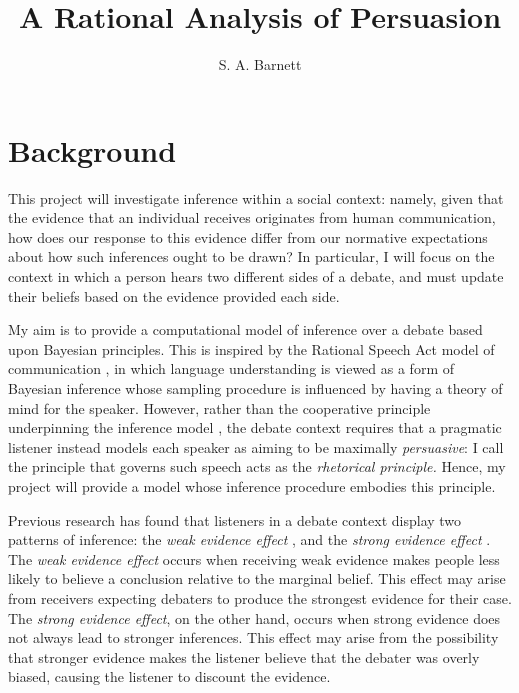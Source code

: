 \documentclass{article}
\title{A Rational Analysis of Persuasion}
\author{S. A. Barnett}
\date{}
\begin{document}
\maketitle

\section{Background}

This project will investigate inference within a social context: namely, given that the evidence that an individual receives originates from human communication, how does our response to this evidence differ from our normative expectations about how such inferences ought to be drawn? In particular, I will focus on the context in which a person hears two different sides of a debate, and must update their beliefs based on the evidence provided each side. 

My aim is to provide a computational model of inference over a debate based upon Bayesian principles. This is inspired by the Rational Speech Act model of communication \cite{goodman_pragmatic_2016}, in which language understanding is viewed as a form of Bayesian inference whose sampling procedure is influenced by having a theory of mind for the speaker. However, rather than the cooperative principle underpinning the inference model \cite{grice_logic_1975}, the debate context requires that a pragmatic listener instead models each speaker as aiming to be maximally \textit{persuasive}: I call the principle that governs such speech acts as the \textit{rhetorical principle.} Hence, my project will provide a model whose inference procedure embodies this principle.

Previous research has found that listeners in a debate context display two patterns of inference: the \textit{weak evidence effect} \cite{mckenzie_when_2002, fernbach_when_2011, harris_james_2013}, and the \textit{strong evidence effect} \cite{perfors_stronger_2018}. The \textit{weak evidence effect} occurs when receiving weak evidence makes people less likely to believe a conclusion relative to the marginal belief. This effect may arise from receivers expecting debaters to produce the strongest evidence for their case. The \textit{strong evidence effect}, on the other hand, occurs when strong evidence does not always lead to stronger inferences. This effect may arise from the possibility that stronger evidence makes the listener believe that the debater was overly biased, causing the listener to discount the evidence.
\end{document}
